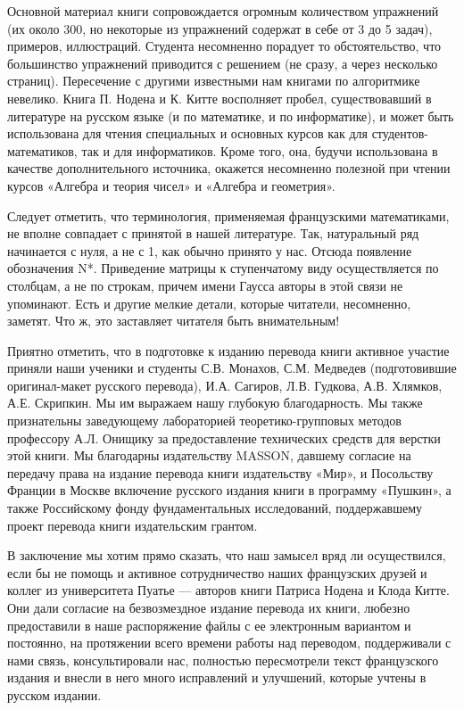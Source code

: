 \documentclass{mai_book}
\begin{document}
{{   Основной материал книги сопровождается огромным количеством упражнений (их около 300, но некоторые из упражнений содержат в себе от 3 до 5 задач), примеров, иллюстраций. Студента несомненно порадует то обстоятельство, что большинство упражнений приводится с решением (не сразу, а через несколько страниц). Пересечение с другими известными нам книгами по алгоритмике невелико.
Книга П. Нодена и К. Китте восполняет пробел, существовавший в литературе на русском языке (и по математике, и по информатике), и может быть использована для чтения специальных и основных курсов как для студентов-математиков, так и для информатиков. Кроме того, она, будучи использована в качестве дополнительного источника, окажется несомненно полезной при чтении курсов «Алгебра и теория чисел» и «Алгебра и геометрия».

   Следует отметить, что терминология, применяемая французскими математиками, не вполне совпадает с принятой в нашей литературе. Так, натуральный ряд начинается с нуля, а не с 1, как обычно принято у нас. Отсюда появление обозначения N*. Приведение матрицы к ступенчатому виду осуществляется по столбцам, а не по строкам, причем имени Гаусса авторы в этой связи не упоминают. Есть и другие мелкие детали, которые читатели, несомненно, заметят. Что ж, это заставляет читателя быть внимательным!

  Приятно отметить, что в подготовке к изданию перевода книги активное участие приняли наши ученики и студенты С.В. Монахов, С.М. Медведев (подготовившие оригинал-макет русского перевода), И.А. Сагиров, Л.В. Гудкова, А.В. Хлямков, А.Е. Скрипкин. Мы им выражаем нашу глубокую благодарность. Мы также признательны заведующему лабораторией теоретико-групповых методов профессору А.Л. Онищику за предоставление технических средств для верстки этой книги. Мы благодарны издательству MASSON, давшему согласие на передачу права на издание перевода книги издательству «Мир», и Посольству Франции в Москве включение русского издания книги
\newpage 
в программу «Пушкин», а также Российскому фонду фундаментальных исследований, поддержавшему проект перевода книги издательским грантом.

   В заключение мы хотим прямо сказать, что наш замысел вряд ли осуществился, если бы не помощь и активное сотрудничество наших французских друзей и коллег из университета Пуатье — авторов книги Патриса Нодена и Клода Китте. Они дали согласие на безвозмездное издание перевода их книги, любезно предоставили в наше распоряжение файлы с ее электронным вариантом и постоянно, на протяжении всего времени работы над переводом, поддерживали с нами связь, консультировали нас, полностью пересмотрели текст французского издания и внесли в него много исправлений и улучшений, которые учтены в русском издании.
   
}}
\end{document}
